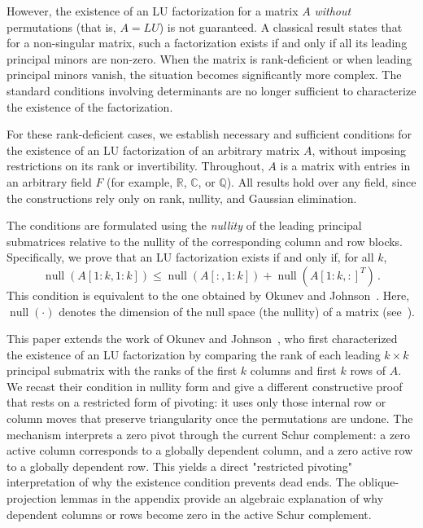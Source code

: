 \documentclass[10pt,twoside]{siamart1116}
\DeclareMathOperator{\nl}{null}
\numberwithin{theorem}{section}
\begin{document}
However, the existence of an LU factorization for a matrix $A$ \emph{without} permutations (that is, $A = LU$) is not guaranteed. A classical result states that for a non-singular matrix, such a factorization exists if and only if all its leading principal minors are non-zero. When the matrix is rank-deficient or when leading principal minors vanish, the situation becomes significantly more complex. The standard conditions involving determinants are no longer sufficient to characterize the existence of the factorization.

For these rank-deficient cases, we establish necessary and sufficient conditions for the existence of an LU factorization of an arbitrary matrix $A$, without imposing restrictions on its rank or invertibility. Throughout, $A$ is a matrix with entries in an arbitrary field $F$ (for example, $\mathbb{R}$, $\mathbb{C}$, or $\mathbb{Q}$). All results hold over any field, since the constructions rely only on rank, nullity, and Gaussian elimination.

The conditions are formulated using the \emph{nullity} of the leading principal submatrices relative to the nullity of the corresponding column and row blocks. Specifically, we prove that an LU factorization exists if and only if, for all $k$,
\[
  \nl(A[1:k,1:k]) \le \nl(A[:,1:k]) + \nl({A[1:k,:]}^T) \,.
\]
This condition is equivalent to the one obtained by Okunev and Johnson~\cite{okunev_necessary_2005}. Here, $\nl(\cdot)$ denotes the dimension of the null space (the nullity) of a matrix (see~).

This paper extends the work of Okunev and Johnson~\cite{okunev_necessary_2005}, who first characterized the existence of an LU factorization by comparing the rank of each leading $k \times k$ principal submatrix with the ranks of the first $k$ columns and first $k$ rows of $A$. We recast their condition in nullity form and give a different constructive proof that rests on a restricted form of pivoting: it uses only those internal row or column moves that preserve triangularity once the permutations are undone. The mechanism interprets a zero pivot through the current Schur complement: a zero active column corresponds to a globally dependent column, and a zero active row to a globally dependent row. This yields a direct "restricted pivoting" interpretation of why the existence condition prevents dead ends. The oblique-projection lemmas in the appendix provide an algebraic explanation of why dependent columns or rows become zero in the active Schur complement.
\end{document}
